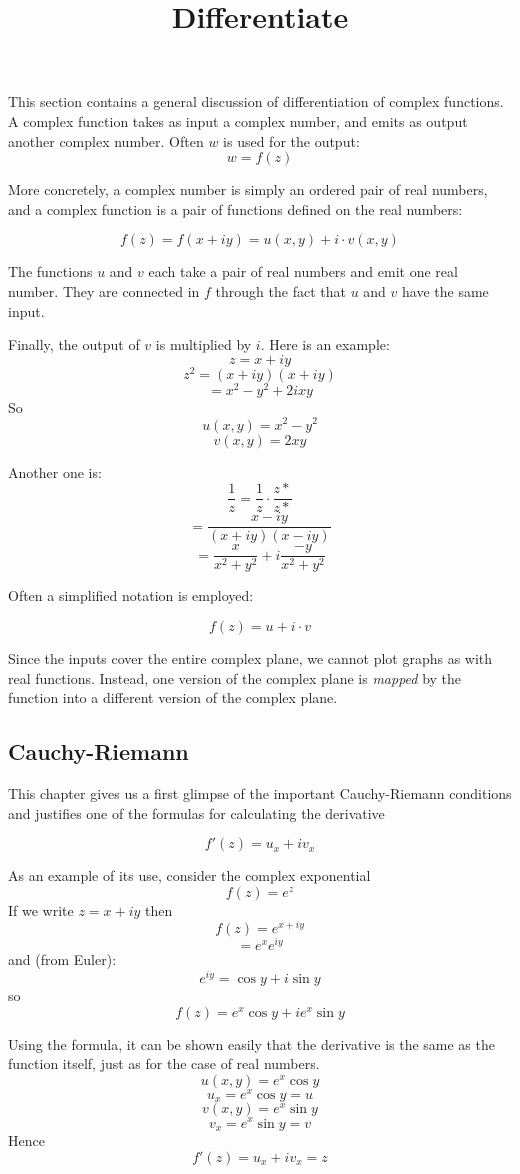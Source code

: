 \documentclass[11pt, oneside]{article}
\title{Differentiate}
\date{}
\begin{document}
\maketitle
\Large

This section contains a general discussion of differentiation of complex functions.  A complex function takes as input a complex number, and emits as output another complex number.  Often $w$ is used for the output:
\[ w = f(z) \]

More concretely, a complex number is simply an ordered pair of real numbers, and a complex function is a pair of functions defined on the real numbers:

\[ f(z) = f(x + iy) = u(x,y) + i \cdot v(x,y) \]

The functions $u$ and $v$ each take a pair of real numbers and emit one real number.  They are connected in $f$ through the fact that $u$ and $v$ have the same input.

Finally, the output of $v$ is multiplied by $i$.  Here is an example:
\[ z = x + iy \]
\[ z^2 = (x + iy)(x + iy) \]
\[ = x^2 - y^2 + 2ixy \]
So
\[ u(x,y) = x^2 - y^2 \]
\[ v(x,y) = 2xy \]

Another one is:
\[ \frac{1}{z} = \frac{1}{z} \cdot \frac{z*}{z*} \]
\[ = \frac{x - iy}{(x + iy)(x - iy)} \]
\[ = \frac{x}{x^2 + y^2} + i \frac{-y}{x^2 + y^2} \]

Often a simplified notation is employed:

\[ f(z) = u + i \cdot v \]

Since the inputs cover the entire complex plane, we cannot plot graphs as with real functions.  Instead, one version of the complex plane is \emph{mapped} by the function into a different version of the complex plane.

\subsection*{Cauchy-Riemann}

This chapter gives us a first glimpse of the important Cauchy-Riemann conditions and justifies one of the formulas for calculating the derivative

\[ f'(z) = u_x + i v_x \]

As an example of its use, consider the complex exponential
\[ f(z) = e^z \]
If we write $z = x + iy$ then
\[ f(z) = e^{x + iy} \]
\[ = e^x e^{iy} \]
and (from Euler):
\[ e^{iy} = \cos y + i \sin y \]
so
\[ f(z) = e^x \cos y + i e^x \sin y \]

Using the formula, it can be shown easily that the derivative is the same as the function itself, just as for the case of real numbers.
\[ u(x,y) = e^x \cos y \]
\[ u_x = e^x \cos y = u \]
\[ v(x,y) = e^x \sin y \]
\[ v_x = e^x \sin y = v \]
Hence
\[f'(z) = u_x + iv_x = z \]
\end{document}
